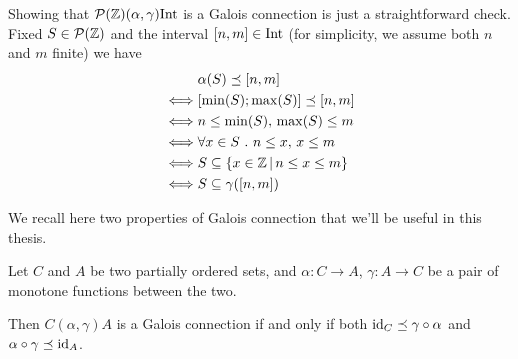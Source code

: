 \begin{example}[Intervals]
	Showing that $\mathcal{P}(\mathbb{Z}) (\alpha, \gamma) \text{Int}$ is a Galois connection is just a straightforward check. Fixed $S \in \mathcal{P}(\mathbb{Z})$ and the interval $[n, m] \in \text{Int}$ (for simplicity, we assume both $n$ and $m$ finite) we have
	\begin{align*}
		& \alpha(S) \preceq [n, m] \\
		\iff &[\min(S); \max(S)] \preceq [n, m] \\
		\iff &n \le \min(S),\, \max(S) \le m \\
		\iff &\forall x \in S\ .\ n \le x,\, x \le m \\
		\iff &S \subseteq \{ x \in \mathbb{Z} \,\vert\, n \le x \le m \} \\
		\iff &S \subseteq \gamma([n, m])
	\end{align*}
\end{example}

We recall here two properties of Galois connection that we'll be useful in this thesis.

\begin{prop}\label{ch2:th:gc-extensive-charact}
	Let $C$ and $A$ be two partially ordered sets, and $\alpha : C \rightarrow A$, $\gamma : A \rightarrow C$ be a pair of monotone functions between the two.
	
	Then $C (\alpha, \gamma) A$ is a Galois connection if and only if both $\text{id}_C \preceq \gamma \circ \alpha$ and $\alpha \circ \gamma \preceq \text{id}_A$.
\end{prop}
%	

